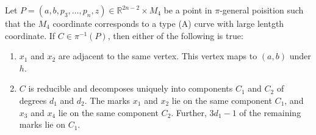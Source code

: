 \begin{lemma}
    \label{reduCntLem}
   Let $P = (a,b, p_{3}, \dots, p_{n}, z) \in \mathbb{R}^{2n-2} \times M_{4}$ be a point in $\pi$-general poisition such that the $M_{4}$ coordinate corresponds to a type (A) curve with large lentgth coordinate. 
   If $C \in \pi^{-1}(P)$, then either of the following is true:
   \begin{enumerate}
       \item $x_{1}$ and $x_{2}$ are adjacent to the same vertex. This vertex maps to $(a,b)$ under $h$.
       \item $C$ is reducible and decomposes uniquely into components $C_{1}$ and $C_{2}$ of degrees $d_{1}$ and $d_{2}$. 
           The marks $x_{1}$ and $x_{2}$ lie on the same component $C_{1}$, and $x_{3}$ and $x_{4}$ lie on the same component $C_{2}$.
           Further, $3d_{1}-1$ of the remaining marks lie on $C_{1}$.
   \end{enumerate}
\end{lemma}
